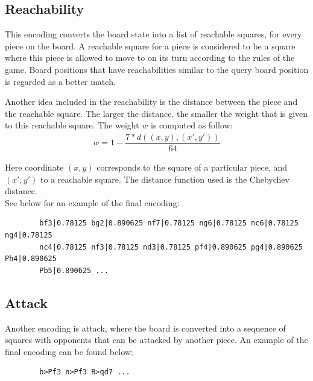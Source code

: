 \documentclass[11pt]{article}
\begin{document}
    \subsection{Reachability}

    This encoding converts the board state into a list of reachable squares, for every piece on the board. A reachable square for a piece is considered to be a square where this piece is allowed to move to on its turn according to the rules of the game. Board positions that have reachabilities similar to the query board position is regarded as a better match.

    Another idea included in the reachability is the distance between the piece and the reachable square. The larger the distance, the smaller the weight that is given to this reachable square.
    The weight $w$ is computed as follow:\\

    \begin{equation}
        \begin{align}
            w = 1 - \dfrac{7 * d((x,y),(x',y'))}{64}
        \end{align}\label{eq:reachabilityDistance}
    \end{equation}

    Here coordinate $(x,y)$ corresponds to the square of a particular piece, and $(x',y')$ to a reachable square. The distance function used is the Chebychev distance.\\
    See below for an example of the final encoding:

    \begin{verbatim}
        bf3|0.78125 bg2|0.890625 nf7|0.78125 ng6|0.78125 nc6|0.78125 ng4|0.78125
        nc4|0.78125 nf3|0.78125 nd3|0.78125 pf4|0.890625 pg4|0.890625 Ph4|0.890625
        Pb5|0.890625 ...
    \end{verbatim}

    \subsection{Attack}

    Another encoding is attack, where the board is converted into a sequence of squares with opponents that can be attacked by another piece. An example of the final encoding can be found below:

    \begin{verbatim}
        b>Pf3 n>Pf3 B>qd7 ...
    \end{verbatim}
\end{document}
